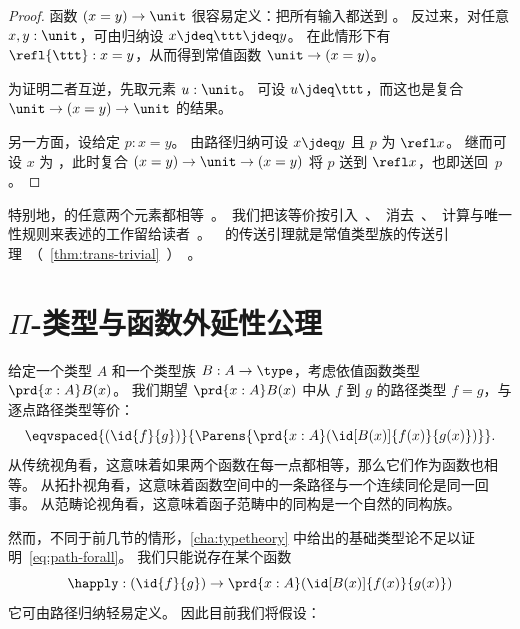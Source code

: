 \begin{proof}
  函数 $(x=y)\to\unit$ 很容易定义：把所有输入都送到 \ttt。
  反过来，对任意 $x,y:\unit$，可由归纳设 $x\jdeq \ttt\jdeq y$。
  在此情形下有 $\refl{\ttt}:x=y$，从而得到常值函数 $\unit\to(x=y)$。

  为证明二者互逆，先取元素 $u:\unit$。
  可设 $u\jdeq\ttt$，而这也是复合 $\unit \to (x=y)\to\unit$ 的结果。

  另一方面，设给定 $p:x=y$。
  由路径归纳可设 $x\jdeq y$ 且 $p$ 为 $\refl x$。
  继而可设 $x$ 为 \ttt，此时复合 $(x=y) \to \unit\to(x=y)$ 将 $p$ 送到 $\refl x$，也即送回~$p$。
\end{proof}

特别地，\unit 的任意两个元素都相等。
我们把该等价按引入、消去、计算与唯一性规则来表述的工作留给读者。
%
\unit 的传送引理就是常值类型族的传送引理（\cref{thm:trans-trivial}）。

%

\section{\texorpdfstring{$\Pi$}{Π}-类型与函数外延性公理}
\label{sec:compute-pi}

%
%
%
给定一个类型 $A$ 和一个类型族 $B : A \to \type$，考虑依值函数类型 $\prd{x:A}B(x)$。
我们期望 $\prd{x:A} B(x)$ 中从 $f$ 到 $g$ 的路径类型 $f=g$，与逐点路径类型等价：
\begin{equation}
  \eqvspaced{(\id{f}{g})}{\Parens{\prd{x:A} (\id[B(x)]{f(x)}{g(x)})}}.\label{eq:path-forall}
\end{equation}
从传统视角看，这意味着如果两个函数在每一点都相等，那么它们作为函数也相等。
%
从拓扑视角看，这意味着函数空间中的一条路径与一个连续同伦是同一回事。
%
从范畴论视角看，这意味着函子范畴中的同构是一个自然的同构族。

然而，不同于前几节的情形，\cref{cha:typetheory} 中给出的基础类型论不足以证明~\eqref{eq:path-forall}。
我们只能说存在某个函数
\begin{equation}\label{eq:happly}
  \happly : (\id{f}{g}) \to \prd{x:A} (\id[B(x)]{f(x)}{g(x)})
\end{equation}
它可由路径归纳轻易定义。
因此目前我们将假设：

